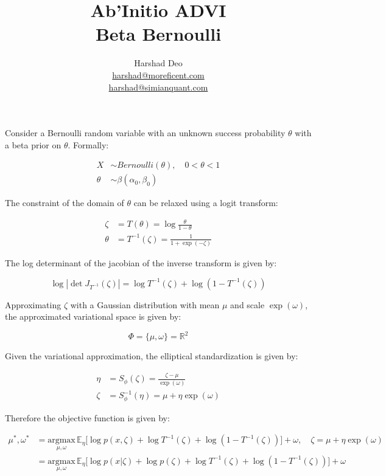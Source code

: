 \documentclass[10pt]{article}
\title{Ab'Initio ADVI \\ Beta Bernoulli}
\author{Harshad Deo \\ 
  \href{mailto:harshad@moreficent.com}{harshad@moreficent.com} \\ 
  \href{mailto:harshad@simianquant.com}{harshad@simianquant.com}
}
\date{}
\begin{document}
  
\maketitle

Consider a Bernoulli random variable with an unknown success probability $\theta$ with a beta prior on $\theta$. Formally:

\begin{align*}
  X &\sim Bernoulli(\theta), \quad 0 < \theta <1\\
  \theta &\sim \beta(\alpha_0, \beta_0)
\end{align*}

The constraint of the domain of $\theta$ can be relaxed using a logit transform:

\begin{align*}
  \zeta &= T(\theta) = \log \frac{\theta}{1 - \theta} \\
  \theta &= T^{-1}(\zeta) = \frac{1}{1 + \exp(-\zeta)}
\end{align*}

The log determinant of the jacobian of the inverse transform is given by:

\begin{equation*}
  \log|\det J_{T^{-1}}(\zeta)| = \log T^{-1}(\zeta) + \log(1 - T^{-1}(\zeta))
\end{equation*}


Approximating $\zeta$ with a Gaussian distribution with mean $\mu$ and scale $\exp(\omega)$, the approximated 
variational space is given by:

\begin{equation*}
  \Phi = \{\mu, \omega\} = \mathbb{R}^2
\end{equation*}

Given the variational approximation, the elliptical standardization is given by:

\begin{align*}
  \eta &= S_{\phi}(\zeta) = \frac{\zeta - \mu}{\exp(\omega)} \\
  \zeta &= S_{\phi}^{-1}(\eta) = \mu + \eta \exp(\omega)
\end{align*}

Therefore the objective function is given by:

\begin{align*}
  \mu^*, \omega^* &= \underset{\mu, \omega}{\text{argmax}}\,\mathbb{E}_\eta\big[\log p(x, \zeta) + \log T^{-1}(\zeta) + \log(1 - T^{-1}(\zeta)) \big] + \omega, \quad \zeta = \mu + \eta\exp(\omega) \\
  &= \underset{\mu, \omega}{\text{argmax}}\,\mathbb{E}_\eta\big[\log p(x | \zeta) + \log p(\zeta) + \log T^{-1}(\zeta) + \log(1 - T^{-1}(\zeta))] + \omega
\end{align*}
\end{document}
